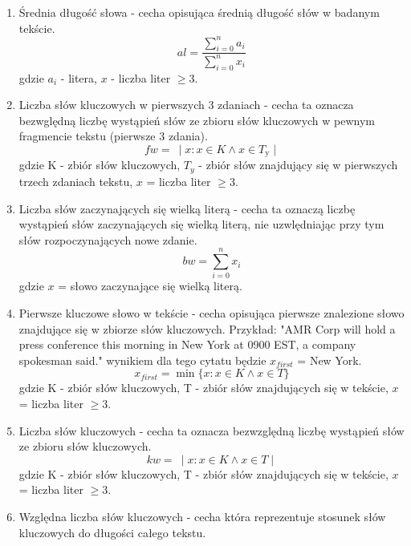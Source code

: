\documentclass{article}
\begin{document}
\begin{enumerate}
    \item Średnia długość słowa - cecha opisująca średnią długość słów w badanym tekście.
     \begin{equation}
            al = \frac{\sum_{i=0}^{n} a_i}{\sum_{i=0}^{n} x_i}
        \end{equation}
        gdzie \( a_i \) - litera, \( x \) - liczba liter \( \geq 3 \).
    \item Liczba słów kluczowych w pierwszych 3 zdaniach - cecha ta oznacza bezwględną liczbę wystąpień słów ze zbioru słów kluczowych w pewnym fragmencie tekstu (pierwsze 3 zdania).
        \begin{equation}
            fw = \ \mid x : x \in K \wedge x \in T_{\text{y}} \mid
        \end{equation}
        gdzie K - zbiór słów kluczowych, \( T_y \) - zbiór słów znajdujący się w pierwszych trzech zdaniach tekstu, \( x\) = liczba liter \( \geq 3 \).
    \item Liczba słów zaczynających się wielką literą - cecha ta oznaczą liczbę wystąpień słów zaczynających się wielką literą, nie uzwlędniając przy tym słów rozpoczynających nowe zdanie.
        \begin{equation}
            bw = \sum_{i=0}^{n} x_i
        \end{equation}
        gdzie \( x \) = słowo zaczynające się wielką literą.
    \item Pierwsze kluczowe słowo w tekście - cecha opisująca pierwsze znalezione słowo znajdujące się w zbiorze słów kluczowych. Przykład: "AMR Corp will hold a press conference this morning in New York at 0900 EST, a company spokesman said." wynikiem dla tego cytatu będzie \(x_{first} \) = New York.
       \begin{equation}
            x_{first} = \min \{x: x \in K \land x \in T \}
        \end{equation}
        gdzie K - zbiór słów kluczowych, T - zbiór słów znajdujących się w tekście, \( x \) = liczba liter \( \geq 3 \).
    \item Liczba słów kluczowych - cecha ta oznacza bezwzględną liczbę wystąpień słów ze zbioru słów kluczowych. 
        \begin{equation}
            kw = \ \mid x : x \in K \land x \in T \mid
        \end{equation}
        gdzie K - zbiór słów kluczowych, T - zbiór słów znajdujących się w tekście, \( x \) = liczba liter \( \geq 3 \).
    \item Względna liczba słów kluczowych - cecha która reprezentuje stosunek słów kluczowych do długości całego tekstu. 

\end{enumerate}
\end{document}
